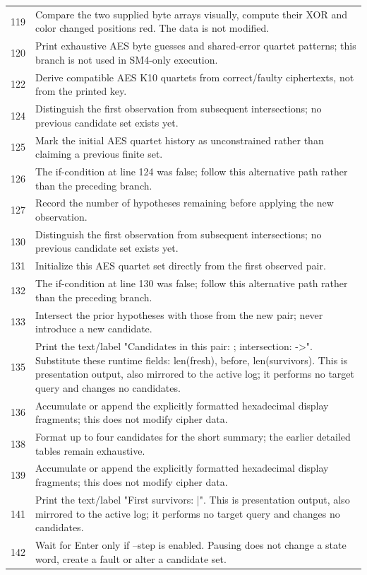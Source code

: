 \begin{longtable}{r >{\raggedright\arraybackslash}p{138mm}}
119&Compare the two supplied byte arrays visually, compute their XOR and color changed positions red. The data is not modified.\\
120&Print exhaustive AES byte guesses and shared-error quartet patterns; this branch is not used in SM4-only execution.\\
122&Derive compatible AES K10 quartets from correct/faulty ciphertexts, not from the printed key.\\
124&Distinguish the first observation from subsequent intersections; no previous candidate set exists yet.\\
125&Mark the initial AES quartet history as unconstrained rather than claiming a previous finite set.\\
126&The if-condition at line 124 was false; follow this alternative path rather than the preceding branch.\\
127&Record the number of hypotheses remaining before applying the new observation.\\
130&Distinguish the first observation from subsequent intersections; no previous candidate set exists yet.\\
131&Initialize this AES quartet set directly from the first observed pair.\\
132&The if-condition at line 130 was false; follow this alternative path rather than the preceding branch.\\
133&Intersect the prior hypotheses with those from the new pair; never introduce a new candidate.\\
135&Print the text/label "Candidates in this pair:  ; intersection:   ->". Substitute these runtime fields: len(fresh), before, len(survivors). This is presentation output, also mirrored to the active log; it performs no target query and changes no candidates.\\
136&Accumulate or append the explicitly formatted hexadecimal display fragments; this does not modify cipher data.\\
138&Format up to four candidates for the short summary; the earlier detailed tables remain exhaustive.\\
139&Accumulate or append the explicitly formatted hexadecimal display fragments; this does not modify cipher data.\\
141&Print the text/label "First survivors:   |". This is presentation output, also mirrored to the active log; it performs no target query and changes no candidates.\\
142&Wait for Enter only if --step is enabled. Pausing does not change a state word, create a fault or alter a candidate set.\\

\end{longtable}
